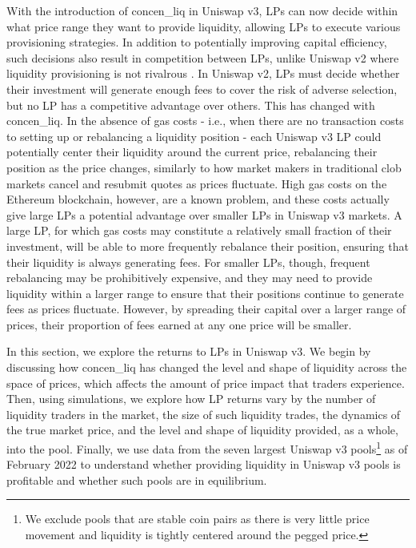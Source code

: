 \documentclass[11pt]{article}
\begin{document}
With the introduction of  \gls{concen_liq} in Uniswap v3, LPs can now decide within what price range they want to provide liquidity, allowing LPs to execute various provisioning strategies. In addition to potentially improving capital efficiency, such decisions also result in competition between LPs, unlike Uniswap v2 where liquidity provisioning is not rivalrous \citep{Lehar2021DecentralizedE}. In Uniswap v2, LPs must decide whether their investment will generate enough fees to cover the risk of adverse selection, but no LP has a competitive advantage over others. This has changed with  \gls{concen_liq}. In the absence of gas costs - i.e., when there are no transaction costs to setting up or rebalancing a liquidity position - each Uniswap v3 LP could potentially center their liquidity around the current price, rebalancing their position as the price changes, similarly to how market makers in traditional \gls{clob} markets cancel and resubmit quotes as prices fluctuate. High gas costs on the Ethereum blockchain, however, are a known problem, and these costs actually give large LPs a potential advantage over smaller LPs in Uniswap v3 markets. A large LP, for which gas costs may constitute a relatively small fraction of their investment, will be able to more frequently rebalance their position, ensuring that their liquidity is always generating fees. For smaller LPs, though, frequent rebalancing may be prohibitively expensive, and they may need to provide liquidity within a larger range to ensure that their positions continue to generate fees as prices fluctuate. However, by spreading their capital over a larger range of prices, their proportion of fees earned at any one price will be smaller.

In this section, we explore the returns to LPs in Uniswap v3. We begin by discussing how  \gls{concen_liq} has changed the level and shape of liquidity across the space of prices, which affects the amount of price impact that traders experience. Then, using simulations, we explore how LP returns vary by the number of liquidity traders in the market, the size of such liquidity trades, the dynamics of the true market price, and the level and shape of liquidity provided, as a whole, into the pool. Finally, we use data from the seven largest Uniswap v3 pools\footnote{We exclude pools that are stable coin pairs as there is very little price movement and liquidity is tightly centered around the pegged price.} as of February 2022 to understand whether providing liquidity in Uniswap v3 pools is profitable and whether such pools are in equilibrium.
\end{document}
